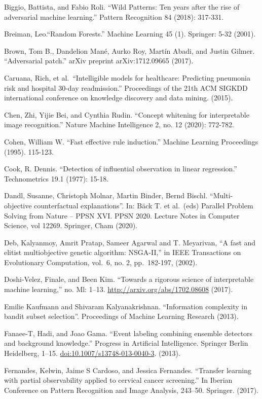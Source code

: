 \documentclass[
  11pt,
]{scrbook}
\begin{document}
Biggio, Battista, and Fabio Roli. ``Wild Patterns: Ten years after the rise of adversarial machine learning.'' Pattern Recognition 84 (2018): 317-331.

Breiman, Leo.``Random Forests.'' Machine Learning 45 (1). Springer: 5-32 (2001).

Brown, Tom B., Dandelion Mané, Aurko Roy, Martín Abadi, and Justin Gilmer. ``Adversarial patch.'' arXiv preprint arXiv:1712.09665 (2017).

Caruana, Rich, et al.~``Intelligible models for healthcare: Predicting pneumonia risk and hospital 30-day readmission.'' Proceedings of the 21th ACM SIGKDD international conference on knowledge discovery and data mining. (2015).

Chen, Zhi, Yijie Bei, and Cynthia Rudin. ``Concept whitening for interpretable image recognition.'' Nature Machine Intelligence 2, no. 12 (2020): 772-782.

Cohen, William W. ``Fast effective rule induction.'' Machine Learning Proceedings (1995). 115-123.

Cook, R. Dennis. ``Detection of influential observation in linear regression.'' Technometrics 19.1 (1977): 15-18.

Dandl, Susanne, Christoph Molnar, Martin Binder, Bernd Bischl. ``Multi-objective counterfactual explanations''. In: Bäck T. et al.~(eds) Parallel Problem Solving from Nature -- PPSN XVI. PPSN 2020. Lecture Notes in Computer Science, vol 12269. Springer, Cham (2020).

Deb, Kalyanmoy, Amrit Pratap, Sameer Agarwal and T. Meyarivan, ``A fast and elitist multiobjective genetic algorithm: NSGA-II,'' in IEEE Transactions on Evolutionary Computation, vol.~6, no. 2, pp.~182-197, (2002).

Doshi-Velez, Finale, and Been Kim. ``Towards a rigorous science of interpretable machine learning,'' no. Ml: 1--13. \url{http://arxiv.org/abs/1702.08608} (2017).

Emilie Kaufmann and Shivaram Kalyanakrishnan. ``Information complexity in bandit subset selection''. Proceedings of Machine Learning Research (2013).

Fanaee-T, Hadi, and Joao Gama. ``Event labeling combining ensemble detectors and background knowledge.'' Progress in Artificial Intelligence. Springer Berlin Heidelberg, 1--15. \url{doi:10.1007/s13748-013-0040-3}. (2013).

Fernandes, Kelwin, Jaime S Cardoso, and Jessica Fernandes. ``Transfer learning with partial observability applied to cervical cancer screening.'' In Iberian Conference on Pattern Recognition and Image Analysis, 243--50. Springer. (2017).
\end{document}
